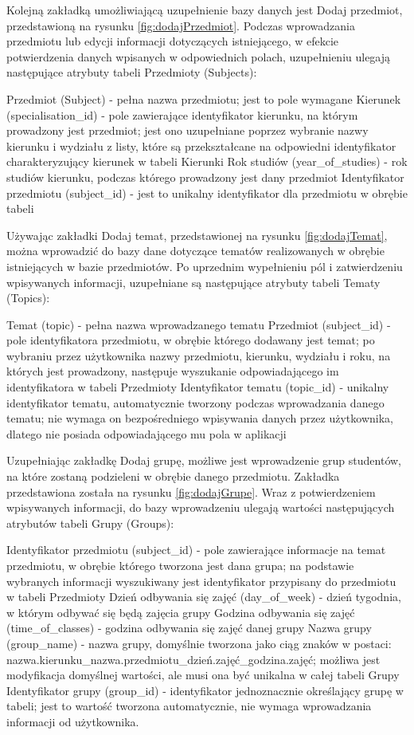 Kolejną zakładką umożliwiającą uzupełnienie bazy danych jest Dodaj przedmiot, przedstawioną na rysunku \ref{fig:dodajPrzedmiot}. Podczas wprowadzania przedmiotu lub edycji informacji dotyczących istniejącego, w efekcie potwierdzenia danych wpisanych w odpowiednich polach, uzupełnieniu ulegają następujące atrybuty tabeli Przedmioty (Subjects):

Przedmiot (Subject) - pełna nazwa przedmiotu; jest to pole wymagane
Kierunek (specialisation_id) - pole zawierające identyfikator kierunku, na którym prowadzony jest przedmiot; jest ono uzupełniane poprzez wybranie nazwy kierunku i wydziału z listy, które są przekształcane na odpowiedni identyfikator charakteryzujący kierunek w tabeli Kierunki
Rok studiów (year_of_studies) - rok studiów kierunku, podczas którego prowadzony jest dany przedmiot
Identyfikator przedmiotu (subject_id) - jest to unikalny identyfikator dla przedmiotu w obrębie tabeli

Używając zakładki Dodaj temat, przedstawionej na rysunku \ref{fig:dodajTemat}, można wprowadzić do bazy dane dotyczące tematów realizowanych w obrębie istniejących w bazie przedmiotów. Po uprzednim wypełnieniu pól i zatwierdzeniu wpisywanych informacji, uzupełniane są następujące atrybuty tabeli Tematy (Topics):

Temat (topic) - pełna nazwa wprowadzanego tematu
Przedmiot (subject_id) - pole identyfikatora przedmiotu, w obrębie którego dodawany jest temat; po wybraniu przez użytkownika nazwy przedmiotu, kierunku, wydziału i roku, na których jest prowadzony, następuje wyszukanie odpowiadającego im identyfikatora w tabeli Przedmioty
Identyfikator tematu (topic_id) - unikalny identyfikator tematu, automatycznie tworzony podczas wprowadzania danego tematu; nie wymaga on bezpośredniego wpisywania danych przez użytkownika, dlatego nie posiada odpowiadającego mu pola w aplikacji

Uzupełniając zakładkę Dodaj grupę, możliwe jest wprowadzenie grup studentów, na które zostaną podzieleni w obrębie danego przedmiotu. Zakładka przedstawiona została na rysunku \ref{fig:dodajGrupe}. Wraz z potwierdzeniem wpisywanych informacji, do bazy wprowadzeniu ulegają wartości następujących atrybutów tabeli Grupy (Groups):

Identyfikator przedmiotu (subject_id) - pole zawierające informacje na temat przedmiotu, w obrębie którego tworzona jest dana grupa; na podstawie wybranych informacji wyszukiwany jest identyfikator przypisany do przedmiotu w tabeli Przedmioty
Dzień odbywania się zajęć (day_of_week) - dzień tygodnia, w którym odbywać się będą zajęcia grupy
Godzina odbywania się zajęć (time_of_classes) - godzina odbywania się zajęć danej grupy
Nazwa grupy (group_name) - nazwa grupy, domyślnie tworzona jako ciąg znaków w postaci: nazwa.kierunku_nazwa.przedmiotu_dzień.zajęć_godzina.zajęć; możliwa jest modyfikacja domyślnej wartości, ale musi ona być unikalna w całej tabeli Grupy
Identyfikator grupy (group_id) - identyfikator jednoznacznie określający grupę w tabeli; jest to wartość tworzona automatycznie, nie wymaga wprowadzania informacji od użytkownika.

